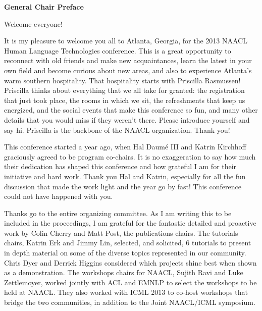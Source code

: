 \documentclass[11pt]{article}
\begin{document}
\begin{center}
  {\Large \bf General Chair Preface} 
\end{center}

\vspace*{0.5cm}



Welcome everyone!

It is my pleasure to welcome you all to Atlanta, Georgia, for the 2013 NAACL Human Language Technologies conference.  This is a great opportunity to reconnect with old friends and make new acquaintances, learn the latest in your own field and become curious about new areas, and also to experience Atlanta's warm southern hospitality.
That hospitality starts with Priscilla Rasmussen! Priscilla thinks about everything that we all take for granted: the registration that just took place, the rooms in which we sit, the refreshments that keep us energized, and the social events that make this conference so fun, and many other details that you would miss if they weren't there. Please introduce yourself and say hi. Priscilla is the backbone of the NAACL organization. Thank you!

This conference started a year ago, when Hal Daumé III and Katrin Kirchhoff graciously agreed to be program co-chairs. It is no exaggeration to say how much their dedication has shaped this conference and how grateful I am for their initiative and hard work. Thank you Hal and Katrin, especially for all the fun discussion that made the work light and the year go by fast!  This conference could not have happened with you.

Thanks go to the entire organizing committee. As I am writing this to be included in the proceedings, I am grateful for the fantastic detailed and proactive work by Colin Cherry and Matt Post, the publications chairs.  The tutorials chairs, Katrin Erk and Jimmy Lin, selected, and solicited, 6 tutorials to present in depth material on some of the diverse topics represented in our community. Chris Dyer and Derrick Higgins considered which projects shine best when shown as a demonstration.  The workshops chairs for NAACL, Sujith Ravi and Luke Zettlemoyer, worked jointly with ACL and EMNLP to select the workshops to be held at NAACL. They also worked with ICML 2013 to co-host workshops that bridge the two communities, in addition to the Joint NAACL/ICML symposium.
\end{document}
